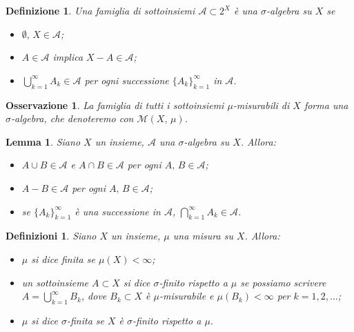 \documentclass[a4paper,10pt,openright,oneside]{book}
\theoremstyle{theoremstyle}
\newtheorem{lemma}[teorema]{Lemma}
\theoremstyle{theoremstylewoheader}
\theoremstyle{theoremstyle}
\newtheorem{definizione}[teorema]{Definizione}
\newtheorem{definizioni}[teorema]{Definizioni}
\newtheorem{osservazione}[teorema]{Osservazione}
\theoremstyle{proofsecstyle}
\theoremstyle{nonumberplain}
\renewcommand{\AA}{\ensuremath{\mathcal{A}}}
\newcommand{\MM}{\ensuremath{\mathcal{M}}}
\begin{document}
\begin{definizione}
\label{def:sigma_algebra}
Una famiglia di sottoinsiemi $\AA \subset 2^X$ è una \emph{$\sigma$-algebra} su $X$ se
\begin{itemize}
\item[(i)] $\emptyset,\, X \in \AA$;
\item[(ii)] $A \in \AA$ implica $X - A \in \AA$;
\item[(iii)] $\bigcup_{k=1}^\infty A_k \in \AA$ per ogni successione $\{A_k\}_{k=1}^\infty$ in $\AA$.
\end{itemize}
\end{definizione}

\begin{osservazione}
La famiglia di tutti i sottoinsiemi $\mu$-misurabili di $X$ forma una $\sigma$-algebra, che denoteremo con $\MM(X,\, \mu)$.
\end{osservazione}

\begin{lemma}
\label{pro:proprieta_sigma_algebra}
Siano $X$ un insieme, $\AA$ una $\sigma$-algebra su $X$. Allora:
\begin{itemize}
\item[(i)] $A \cup B \in \AA$ e $A \cap B \in \AA$ per ogni $A,\, B \in \AA$;
\item[(ii)] $A - B \in \AA$ per ogni $A,\, B \in \AA$;
\item[(iii)] se $\{A_k\}_{k=1}^\infty$ è una successione in $\AA$, $\bigcap_{k=1}^\infty A_k \in \AA$.
\end{itemize}
\end{lemma}
\pagebreak

\begin{definizioni}
Siano $X$ un insieme, $\mu$ una misura su $X$. Allora:
\mbox{}
\begin{itemize}
\item[(i)] $\mu$ si dice \emph{finita} se $\mu(X) < \infty$;
\item[(i)] un sottoinsieme $A \subset X$ si dice \emph{$\sigma$-finito} rispetto a $\mu$ se possiamo scrivere $A = \bigcup_{k=1}^\infty B_k$, dove $B_k \subset X$ è $\mu$-misurabile e $\mu(B_k) < \infty$ per $k = 1, 2, \ldots$;
\item[(iii)] $\mu$ si dice \emph{$\sigma$-finita} se $X$ è $\sigma$-finito rispetto a $\mu$.
\end{itemize}
\end{definizioni}
\end{document}
